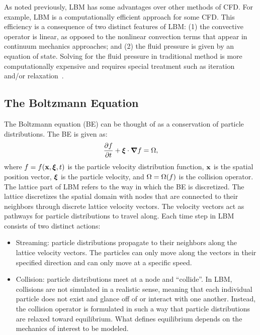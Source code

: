 As noted previously, LBM has some advantages over other methods of CFD.
For example, LBM is a computationally efficient approach for some CFD.
This efficiency is a consequence of two distinct features of LBM: (1) the convective operator is linear, as opposed to the nonlinear convection terms that appear in continuum mechanics approaches; and (2) the fluid pressure is given by an equation of state.
Solving for the fluid pressure in traditional method is more computationally expensive and requires special treatment such as iteration and/or relaxation~\cite{chen1998lattice}.

\subsection{The Boltzmann Equation}
The Boltzmann equation (BE) can be thought of as a conservation of particle distributions.
The BE \DIFaddbegin {}\DIFaddend is given as:
\begin{equation}
\frac{\partial f}{\partial t} + \boldsymbol{\xi} \cdot \boldsymbol{\nabla} f = \Omega,
\end{equation}
\noindent where $f = f(\mathbf{x}, \boldsymbol{\xi}, t)$ is the particle velocity distribution function, $\mathbf{x}$ is the spatial position vector, $\boldsymbol{\xi}$ is the particle velocity, and $\Omega = \Omega(f)$ is the collision operator.
The lattice part of LBM refers to the way in which the BE is discretized.
The lattice discretizes the spatial domain with nodes that are connected to their neighbors through discrete lattice velocity vectors.
The velocity vectors act as pathways for particle distributions to travel along.
Each time step in LBM consists of two distinct actions:

 \begin{itemize} 
\item Streaming: particle distributions propagate to their neighbors along the lattice velocity vectors.
The particles can only move along the vectors in their specified direction and can only move at a specific speed.
\item Collision: particle distributions meet at a node and ``collide''.
In LBM, collisions are not simulated in a realistic sense, meaning that each individual particle does not exist and glance off of or interact with one another.
Instead, the collision operator is formulated in such a way that particle distributions are relaxed toward equilibrium.
What defines equilibrium depends on the mechanics of interest to be modeled.
 \end{itemize} 

